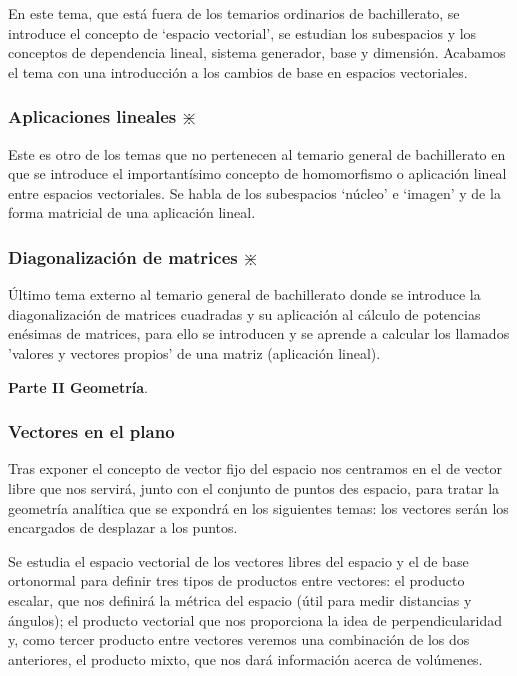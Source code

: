 En este tema, que está fuera de los temarios ordinarios de bachillerato, se introduce el concepto de `espacio vectorial', se estudian los subespacios y los conceptos de dependencia lineal, sistema generador, base y dimensión. Acabamos el tema con una introducción a los cambios de base en espacios vectoriales.

\subsubsection{Aplicaciones lineales  $\divideontimes$}

Este es otro de los temas que no pertenecen al temario general de bachillerato en que se introduce el importantísimo concepto de homomorfismo o aplicación lineal entre espacios vectoriales. Se habla de los subespacios `núcleo' e `imagen' y de la forma matricial de una aplicación lineal.

\subsubsection{Diagonalización de matrices  $\divideontimes$}

Último tema externo al temario general de bachillerato donde se introduce la diagonalización de matrices cuadradas y su aplicación al cálculo de potencias enésimas de matrices, para ello se introducen y se aprende a calcular los llamados 'valores y vectores propios' de una matriz (aplicación lineal).

\vspace{5mm}
\Large {\textbf{Parte II  Geometría}}\normalsize{.}

\subsubsection{Vectores en el plano}

Tras exponer el concepto de vector fijo del espacio nos centramos en el de vector libre que nos servirá, junto con el conjunto de puntos des espacio, para tratar la geometría analítica que se expondrá en los siguientes temas: los vectores serán los encargados de desplazar a los puntos. 

Se estudia el espacio vectorial de los vectores libres del espacio y el de base ortonormal para definir tres tipos de productos entre vectores: el producto escalar, que nos definirá la métrica del espacio (útil para medir distancias y ángulos); el producto vectorial que nos proporciona la idea de perpendicularidad y, como tercer producto entre vectores veremos una combinación de los dos anteriores, el producto mixto, que nos dará información acerca de volúmenes.

